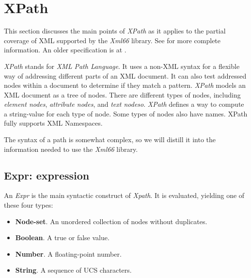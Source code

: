 %
%
%


\section{XPath}
\label{sec:xpath}

   This section discusses the main points of \textsl{XPath}
   as it applies to the partial coverage of XML supported
   by the \textsl{Xml66} library.
   See \cite{xpath} for more complete information.
   An older specification is at \cite{xpath1999}.

   \textsl{XPath} stands for \textsl{XML Path Language}.
   It uses a non-XML syntax for a
   flexible way of addressing different parts of an XML document.
   It can also test addressed nodes within a document to determine
   if they match a pattern.
   \textsl{XPath} models an XML document as a tree of nodes.
   There are different types of nodes, including \textsl{element nodes},
   \textsl{attribute nodes}, and \textsl{text nodeso}.
   \textsl{XPath} defines a way to compute a string-value for each
   type of node.
   Some types of nodes also have names.
   XPath fully supports XML Namespaces.

   The syntax of a path is somewhat complex, so we will
   distill it into the information needed to use the
   \textsl{Xml66} library.

\subsection{Expr: expression}
\label{subsec:xpath_expr_expression}

   An \textsl{Expr} is the main syntactic construct of
   \textsl{Xpath}.
   It is evaluated, yielding one of these four types:

   \begin{itemize}
      \item \textbf{Node-set}.
         An unordered collection of nodes without duplicates.
      \item \textbf{Boolean}.
         A true or false value.
      \item \textbf{Number}.
         A floating-point number.
      \item \textbf{String}.
         A sequence of UCS characters.
   \end{itemize}

